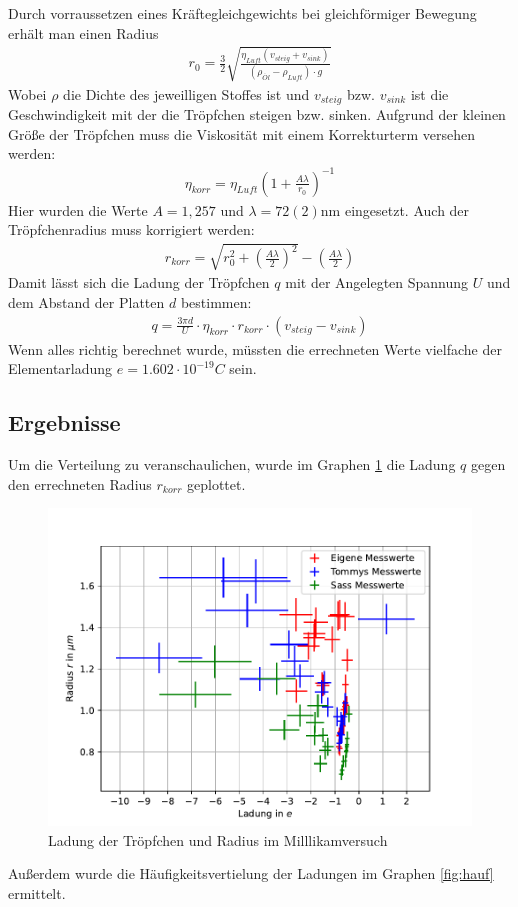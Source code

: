 \documentclass[11pt, a4paper]{article}
\begin{document}
    Durch vorraussetzen eines Kräftegleichgewichts bei gleichförmiger Bewegung erhält man einen Radius
    \begin{align}
        r_0 = \frac{3}{2} \sqrt{\frac{\eta_{Luft} (v_{steig} + v_{sink})}{(\rho_{\ddot{Ol}} - \rho_{Luft}) \cdot g}}%
    \end{align}
    Wobei $\rho$ die Dichte des jeweilligen Stoffes ist und $v_{steig}$ bzw. $v_{sink}$ ist die Geschwindigkeit mit der die Tröpfchen steigen bzw. sinken. Aufgrund der kleinen Größe der Tröpfchen muss die Viskosität mit einem Korrekturterm versehen werden:
    \begin{align}
        \eta_{korr} = \eta_{Luft}\left(1+\frac{A \lambda}{r_0}\right)^{-1}
    \end{align}
    Hier wurden die Werte $A = 1,257$ und $\lambda = 72(2) \si{\nano\metre}$ eingesetzt.
    Auch der Tröpfchenradius muss korrigiert werden:
    \begin{align}
        r_{korr} = \sqrt{r_0^2 + \left(\frac{A \lambda}{2}\right)^2} - \left(\frac{A \lambda}{2}\right)
    \end{align}
    Damit lässt sich die Ladung der Tröpfchen $q$ mit der Angelegten Spannung $U$ und dem Abstand der Platten $d$ bestimmen:
    \begin{align}
        q = \frac{3 \pi d}{U} \cdot \eta_{korr} \cdot r_{korr} \cdot \left(v_{steig} - v_{sink}\right)
    \end{align}
    Wenn alles richtig berechnet wurde, müssten die errechneten Werte vielfache der Elementarladung $e = 1.602 \cdot 10^{-19} \si{C}$ sein.

    \subsection{Ergebnisse}
    Um die Verteilung zu veranschaulichen, wurde im Graphen \ref{fig:milllikam} die Ladung $q$ gegen den errechneten Radius $r_{korr}$ geplottet.
    \begin{figure}[h]
        \centering
        \includegraphics[width=\textwidth]{millikan.pdf}
        \caption{Ladung der Tröpfchen und Radius im Milllikamversuch}
        \label{fig:milllikam}
    \end{figure}
    Außerdem wurde die Häufigkeitsvertielung der Ladungen im Graphen \ref{fig:hauf} ermittelt.
\end{document}
